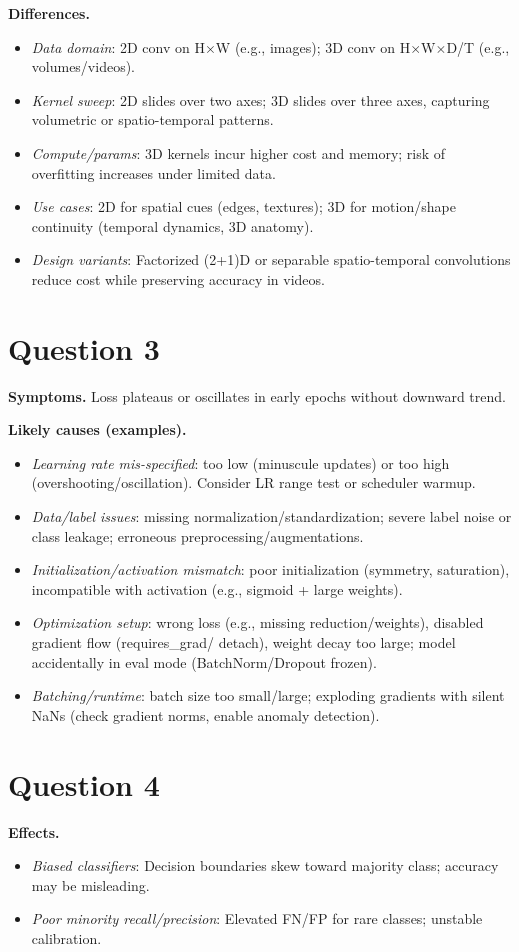 \documentclass{article}
\begin{document}
\textbf{Differences.}
\begin{itemize}[leftmargin=*]
  \item \emph{Data domain}: 2D conv on H$\times$W (e.g., images); 3D conv on H$\times$W$\times$D/T (e.g., volumes/videos).
  \item \emph{Kernel sweep}: 2D slides over two axes; 3D slides over three axes, capturing volumetric or spatio-temporal patterns.
  \item \emph{Compute/params}: 3D kernels incur higher cost and memory; risk of overfitting increases under limited data.
  \item \emph{Use cases}: 2D for spatial cues (edges, textures); 3D for motion/shape continuity (temporal dynamics, 3D anatomy).
  \item \emph{Design variants}: Factorized (2+1)D or separable spatio-temporal convolutions reduce cost while preserving accuracy in videos.
\end{itemize}


\section{Question 3}
\textbf{Symptoms.} Loss plateaus or oscillates in early epochs without downward trend.

\textbf{Likely causes (examples).}
\begin{itemize}[leftmargin=*]
  \item \emph{Learning rate mis-specified}: too low (minuscule updates) or too high (overshooting/oscillation). Consider LR range test or scheduler warmup.
  \item \emph{Data/label issues}: missing normalization/standardization; severe label noise or class leakage; erroneous preprocessing/augmentations.
  \item \emph{Initialization/activation mismatch}: poor initialization (symmetry, saturation), incompatible with activation (e.g., sigmoid + large weights).
  \item \emph{Optimization setup}: wrong loss (e.g., missing reduction/weights), disabled gradient flow (requires\_grad/ detach), weight decay too large; model accidentally in eval mode (BatchNorm/Dropout frozen).
  \item \emph{Batching/runtime}: batch size too small/large; exploding gradients with silent NaNs (check gradient norms, enable anomaly detection).
\end{itemize}

\section{Question 4}
\textbf{Effects.}
\begin{itemize}[leftmargin=*]
    \item \emph{Biased classifiers}: Decision boundaries skew toward majority class; accuracy may be misleading.
    \item \emph{Poor minority recall/precision}: Elevated FN/FP for rare classes; unstable calibration.
\end{itemize}
\end{document}
